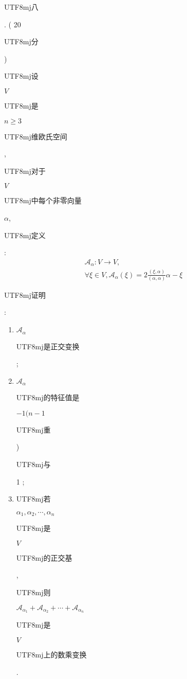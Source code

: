 \documentclass[10pt]{article}
\begin{document}
\begin{CJK}{UTF8}{mj}八\end{CJK}. ( 20 \begin{CJK}{UTF8}{mj}分\end{CJK}) \begin{CJK}{UTF8}{mj}设\end{CJK} $V$ \begin{CJK}{UTF8}{mj}是\end{CJK} $n \geqslant 3$ \begin{CJK}{UTF8}{mj}维欧氏空间\end{CJK}, \begin{CJK}{UTF8}{mj}对于\end{CJK} $V$ \begin{CJK}{UTF8}{mj}中每个非零向量\end{CJK} $\alpha$, \begin{CJK}{UTF8}{mj}定义\end{CJK}:
$$
\begin{gathered}
\mathscr{A}_{\alpha}: V \rightarrow V, \\
\forall \xi \in V, \mathscr{A}_{\alpha}(\xi)=2 \frac{(\xi, \alpha)}{(\alpha, \alpha)} \alpha-\xi
\end{gathered}
$$
\begin{CJK}{UTF8}{mj}证明\end{CJK}:

\begin{enumerate}
  \item $\mathscr{A}_{\alpha}$ \begin{CJK}{UTF8}{mj}是正交变换\end{CJK};

  \item $\mathscr{A}_{\alpha}$ \begin{CJK}{UTF8}{mj}的特征值是\end{CJK} $-1(n-1$ \begin{CJK}{UTF8}{mj}重\end{CJK}) \begin{CJK}{UTF8}{mj}与\end{CJK} 1 ;

  \item \begin{CJK}{UTF8}{mj}若\end{CJK} $\alpha_{1}, \alpha_{2}, \cdots, \alpha_{n}$ \begin{CJK}{UTF8}{mj}是\end{CJK} $V$ \begin{CJK}{UTF8}{mj}的正交基\end{CJK}, \begin{CJK}{UTF8}{mj}则\end{CJK} $\mathscr{A}_{\alpha_{1}}+\mathscr{A}_{\alpha_{2}}+\cdots+\mathscr{A}_{\alpha_{n}}$ \begin{CJK}{UTF8}{mj}是\end{CJK} $V$ \begin{CJK}{UTF8}{mj}上的数乘变换\end{CJK}.

\end{enumerate}
\end{document}
